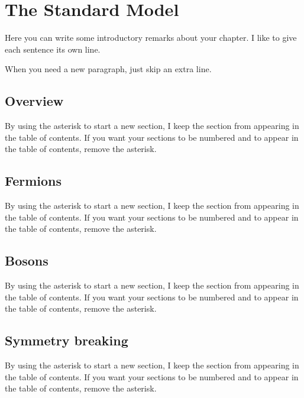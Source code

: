 

\chapter[The Standard Model][Top of Page Title]{The Standard Model}

Here you can write some introductory remarks about your chapter.
I like to give each sentence its own line.

When you need a new paragraph, just skip an extra line.

\section{Overview}

By using the asterisk to start a new section, I keep the section from appearing in the table of contents.
If you want your sections to be numbered and to appear in the table of contents, remove the asterisk.


\section{Fermions}

By using the asterisk to start a new section, I keep the section from appearing in the table of contents.
If you want your sections to be numbered and to appear in the table of contents, remove the asterisk.

\section{Bosons}

By using the asterisk to start a new section, I keep the section from appearing in the table of contents.
If you want your sections to be numbered and to appear in the table of contents, remove the asterisk.

\section{Symmetry breaking}

By using the asterisk to start a new section, I keep the section from appearing in the table of contents.
If you want your sections to be numbered and to appear in the table of contents, remove the asterisk.

